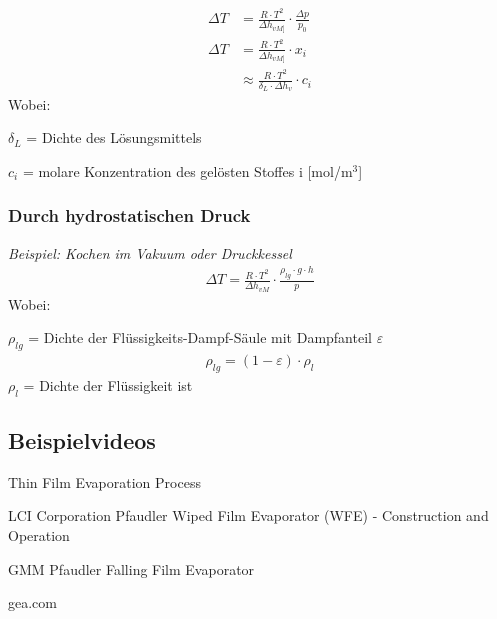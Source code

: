 \documentclass[a4paper,10pt]{article}
\begin{document}
\begin{align*}
\Delta T &= \frac{R \cdot T^2}{\Delta h_{vM]}} \cdot \frac{\Delta p}{p_0} \\
\Delta T &= \frac{R \cdot T^2}{\Delta h_{vM]}} \cdot x_i \\
&\approx \frac{R \cdot T^2}{\delta_L \cdot \Delta h_v} \cdot c_i
\end{align*}
\pp
Wobei:\par 
$\delta_L$ = Dichte des Lösungsmittels \par 
$c_i$ = molare Konzentration des gelösten Stoffes i [mol/m$^3$]

\ppbig 


\subsubsection{Durch hydrostatischen Druck}
\textit{Beispiel: Kochen im Vakuum oder Druckkessel}
\begin{align*}
\Delta T = \frac{R \cdot T^2}{\Delta h_{vM}} \cdot \frac{\rho_{lg} \cdot g \cdot h}{p}
\end{align*}
Wobei: \par
$\rho_{lg}$ = Dichte der Flüssigkeits-Dampf-Säule mit Dampfanteil $\varepsilon$
\begin{align*}
\rho_{lg} = (1 - \varepsilon) \cdot \rho_l
\end{align*}
$\rho_l$ = Dichte der Flüssigkeit ist






\ppbig





\subsection{Beispielvideos}
Thin Film Evaporation Process \par 
LCI Corporation \pp
Pfaudler Wiped Film Evaporator (WFE) - Construction and Operation \par 
GMM Pfaudler \pp
Falling Film Evaporator \par 
gea.com \pp
\end{document}
